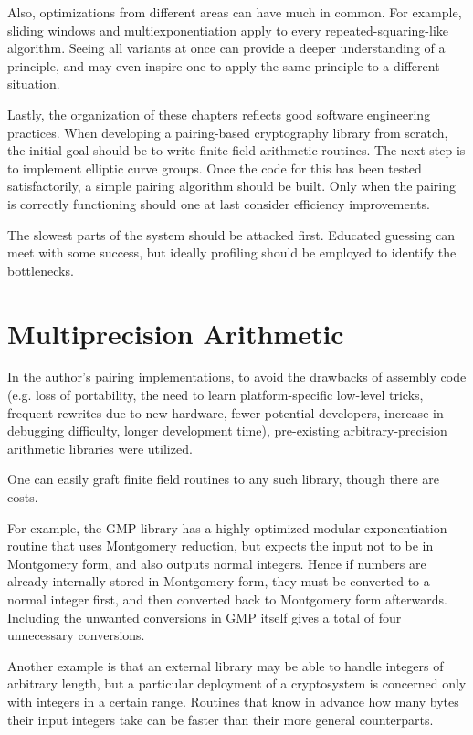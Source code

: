 Also, optimizations from different areas can have much in common. For example,
sliding windows and multiexponentiation apply to every repeated-squaring-like
algorithm. Seeing all variants at once can provide a deeper understanding of
a principle, and may even inspire one to apply the same principle to a
different situation.

Lastly, the organization of these chapters reflects good software
engineering practices. When developing a pairing-based cryptography
library from scratch,
the initial goal should be to write finite field arithmetic
routines. The next step is to implement elliptic curve groups.
Once the code for this has been tested satisfactorily, a simple
pairing algorithm should be built.
Only when the pairing is correctly functioning
should one at last consider efficiency improvements.

The slowest parts of the system should be attacked first.
Educated guessing can meet with some success, but
ideally profiling should be employed to identify the
bottlenecks.

\section{Multiprecision Arithmetic}

In the author's pairing implementations, to avoid the drawbacks
of assembly code (e.g. loss of portability, the need to learn platform-specific
low-level tricks, frequent rewrites due to new hardware,
fewer potential developers, increase in debugging difficulty, longer
development time),
pre-existing arbitrary-precision arithmetic libraries
were utilized.

One can easily graft finite field routines to any such library,
though there are costs.

For example, the GMP library has a highly optimized modular exponentiation
routine that uses Montgomery reduction,
but expects the input not to be
in Montgomery form, and also outputs normal integers.
Hence if numbers are already internally stored in Montgomery form,
they must be converted to a normal integer first, and then converted
back to Montgomery form afterwards. Including the unwanted conversions in
GMP itself gives a total of four unnecessary conversions.

Another example is that an external library may be able to handle integers
of arbitrary length, but a particular deployment of a cryptosystem is
concerned only with integers in a certain range. Routines that know
in advance how many bytes their input integers take can be faster than
their more general counterparts.

